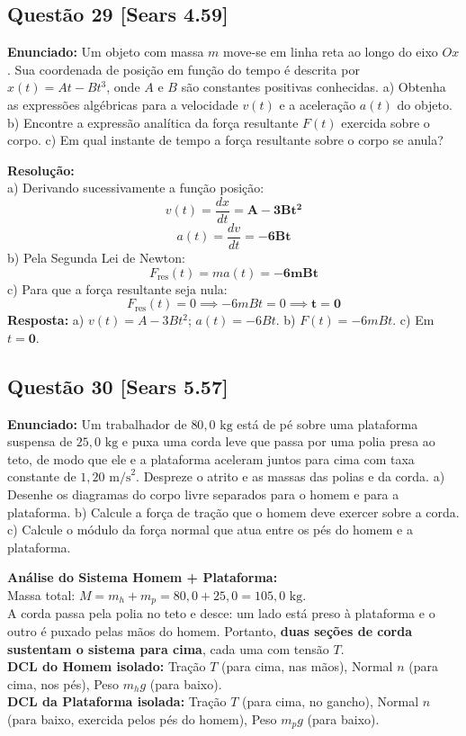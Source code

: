 \documentclass[11pt,a4paper]{article}
\begin{document}
\vspace{0.3cm}
\subsection*{Questão 29 [Sears 4.59]}
\textbf{Enunciado:} Um objeto com massa $m$ move-se em linha reta ao longo do eixo $Ox$. Sua coordenada de posição em função do tempo é descrita por $x(t) = A t - B t^3$, onde $A$ e $B$ são constantes positivas conhecidas. a) Obtenha as expressões algébricas para a velocidade $v(t)$ e a aceleração $a(t)$ do objeto. b) Encontre a expressão analítica da força resultante $F(t)$ exercida sobre o corpo. c) Em qual instante de tempo a força resultante sobre o corpo se anula?

\noindent
\textbf{Resolução:}\\
a) Derivando sucessivamente a função posição:
\[ v(t) = \frac{dx}{dt} = \mathbf{A - 3Bt^2} \]
\[ a(t) = \frac{dv}{dt} = \mathbf{-6Bt} \]
b) Pela Segunda Lei de Newton:
\[ F_{\text{res}}(t) = m a(t) = \mathbf{-6mBt} \]
c) Para que a força resultante seja nula:
\[ F_{\text{res}}(t) = 0 \implies -6mBt = 0 \implies \mathbf{t = 0} \]
\textbf{Resposta:} a) $v(t) = A - 3Bt^2$; $a(t) = -6Bt$. b) $F(t) = -6mBt$. c) Em $t = \mathbf{0}$.

\vspace{0.3cm}
\subsection*{Questão 30 [Sears 5.57]}
\textbf{Enunciado:} Um trabalhador de $80,0\text{ kg}$ está de pé sobre uma plataforma suspensa de $25,0\text{ kg}$ e puxa uma corda leve que passa por uma polia presa ao teto, de modo que ele e a plataforma aceleram juntos para cima com taxa constante de $1,20\text{ m/s}^2$. Despreze o atrito e as massas das polias e da corda. a) Desenhe os diagramas do corpo livre separados para o homem e para a plataforma. b) Calcule a força de tração que o homem deve exercer sobre a corda. c) Calcule o módulo da força normal que atua entre os pés do homem e a plataforma.

\begin{dclbox}
\textbf{Análise do Sistema Homem + Plataforma:}\\
Massa total: $M = m_h + m_p = 80,0 + 25,0 = 105,0\text{ kg}$.\\
A corda passa pela polia no teto e desce: um lado está preso à plataforma e o outro é puxado pelas mãos do homem. Portanto, \textbf{duas seções de corda sustentam o sistema para cima}, cada uma com tensão $T$.\\
\textbf{DCL do Homem isolado:} Tração $T$ (para cima, nas mãos), Normal $n$ (para cima, nos pés), Peso $m_h g$ (para baixo).\\
\textbf{DCL da Plataforma isolada:} Tração $T$ (para cima, no gancho), Normal $n$ (para baixo, exercida pelos pés do homem), Peso $m_p g$ (para baixo).
\end{dclbox}
\end{document}
